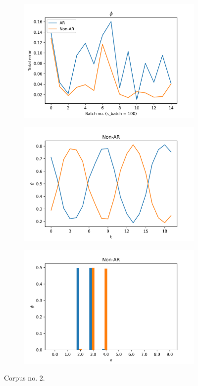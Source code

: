 \documentclass[12pt]{article}
\begin{document}
\begin{figure}[H]
  \begin{subfigure}[b]{0.3\textwidth}
    \includegraphics[width=\linewidth]{performance_phis_experiment-1|overlapping-yes_dataset-2.png}
  \end{subfigure}%
  \begin{subfigure}[b]{0.3\textwidth}
    \includegraphics[width=\linewidth]{latent_thetas_Non-AR_experiment-1|overlapping-yes_dataset-2.png}
  \end{subfigure}%
  \begin{subfigure}[b]{0.3\textwidth}
    \includegraphics[width=\linewidth]{latent_phis_Non-AR_experiment-1|overlapping-yes_dataset-2.png}
  \end{subfigure}%
  \caption{Corpus no. $2$.}
\end{figure}
\end{document}
